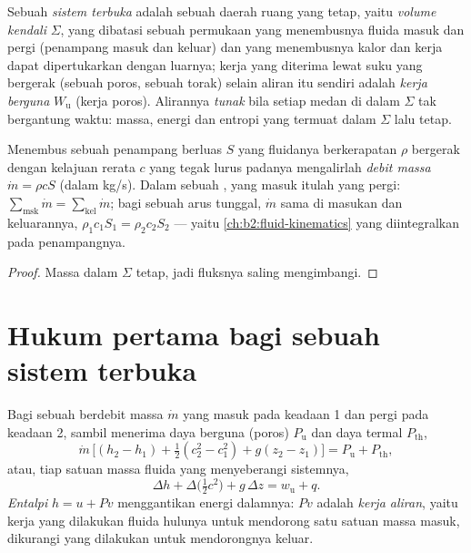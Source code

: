 \begin{definition}\label{def:b2:open-systems:cv}
Sebuah \emph{sistem terbuka} adalah sebuah daerah ruang yang tetap,
yaitu \emph{volume kendali} $\Sigma$, yang dibatasi sebuah
permukaan yang menembusnya fluida masuk dan pergi (penampang masuk dan
keluar) dan yang menembusnya kalor dan kerja dapat dipertukarkan dengan
luarnya; kerja yang diterima lewat suku yang bergerak (sebuah poros, sebuah torak)
selain aliran itu sendiri adalah \emph{kerja berguna}
$W_{\text{u}}$ (kerja poros). Alirannya \emph{tunak} bila setiap medan di dalam $\Sigma$ tak bergantung waktu: massa,
energi dan entropi yang termuat dalam $\Sigma$ lalu tetap.
\end{definition}

\begin{proposition}\label{prop:b2:open-systems:mass}
Menembus sebuah penampang berluas $S$ yang fluidanya berkerapatan $\rho$ bergerak
dengan kelajuan rerata $c$ yang tegak lurus padanya mengalirlah \emph{debit
massa} $\dot m = \rho c S$ (dalam \unit{kg/s}). Dalam sebuah
, yang masuk itulah yang pergi: $\sum_{\text{msk}}\dot m = \sum_{\text{kel}}
\dot m$; bagi sebuah arus tunggal, $\dot m$ sama di masukan dan keluarannya,
$\rho_1c_1S_1 = \rho_2c_2S_2$ --- yaitu 
\cref{ch:b2:fluid-kinematics} yang diintegralkan pada penampangnya.
\end{proposition}

\begin{proof}
Massa dalam $\Sigma$ tetap, jadi fluksnya saling mengimbangi.
\end{proof}

\section{Hukum pertama bagi sebuah sistem terbuka}

\begin{theorem}\label{thm:b2:open-systems:firstlaw}
Bagi sebuah  berdebit massa $\dot m$ yang masuk pada keadaan 1
dan pergi pada keadaan 2, sambil menerima daya berguna (poros)
$P_{\text{u}}$ dan daya termal $P_{\text{th}}$,
\[
\dot m\,\Big[(h_2 - h_1) + \tfrac12(c_2^2 - c_1^2) + g(z_2 - z_1)\Big]
= P_{\text{u}} + P_{\text{th}} ,
\]
atau, tiap satuan massa fluida yang menyeberangi sistemnya,
\[
\Delta h + \Delta\big(\tfrac12c^2\big) + g\,\Delta z = w_{\text{u}} + q .
\]
\emph{Entalpi} $h = u + Pv$ menggantikan
energi dalamnya: $Pv$ adalah \emph{kerja aliran}, yaitu kerja yang dilakukan
fluida hulunya untuk mendorong satu satuan massa masuk, dikurangi yang dilakukan untuk mendorongnya
keluar.
\end{theorem}

